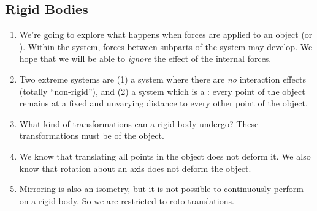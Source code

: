 \subsection{Rigid Bodies}

\begin{enumerate}
  \item We're going to explore what happens when 
  forces are applied to an object (or ). Within the
  system,  forces between subparts of the system may
  develop. We hope that we will be able to \emph{ignore} the effect of
  the internal forces.

  \item Two extreme systems are (1) a system where there are \emph{no}
  interaction effects (totally ``non-rigid''), and (2) a system which is
  a : every point of the object remains at a fixed
  and unvarying distance to every other point of the object.

  \item What kind of transformations can a rigid body undergo? These
  transformations must be  of the object.

  \item We know that translating all points in the object does not
  deform it. We also know that rotation about an axis does not deform
  the object.

  \item Mirroring is also an isometry, but it is not possible to
  continuously perform on a rigid body. So we are restricted to
  roto-translations.
\end{enumerate}
